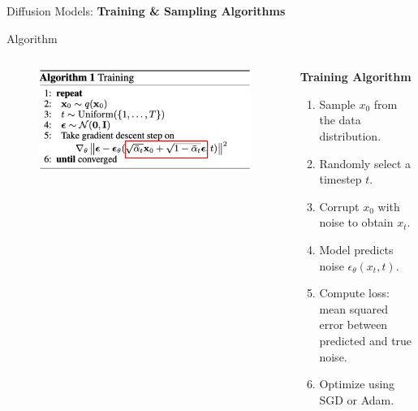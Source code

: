 \begin{frame}{}
    \LARGE Diffusion Models: \textbf{Training \& Sampling Algorithms}
\end{frame}

\begin{frame}[allowframebreaks]{Algorithm}
\begin{columns}
    \begin{column}{0.5\textwidth}
       \begin{figure}
            \centering
            \includegraphics[height=0.7\textheight, width=\textwidth, keepaspectratio]{images/diffusion/diff_5.png}
        \end{figure}
    \end{column}
    \begin{column}{0.5\textwidth}
        \textbf{Training Algorithm}
        \begin{enumerate}
            \item Sample $x_0$ from the data distribution.
            \item Randomly select a timestep $t$.
            \item Corrupt $x_0$ with noise to obtain $x_t$.
            \item Model predicts noise $\epsilon_\theta(x_t, t)$.
            \item Compute loss: mean squared error between predicted and true noise.
            \item Optimize using SGD or Adam.
        \end{enumerate}
    \end{column}
\end{columns}
    
\framebreak


\end{frame}
